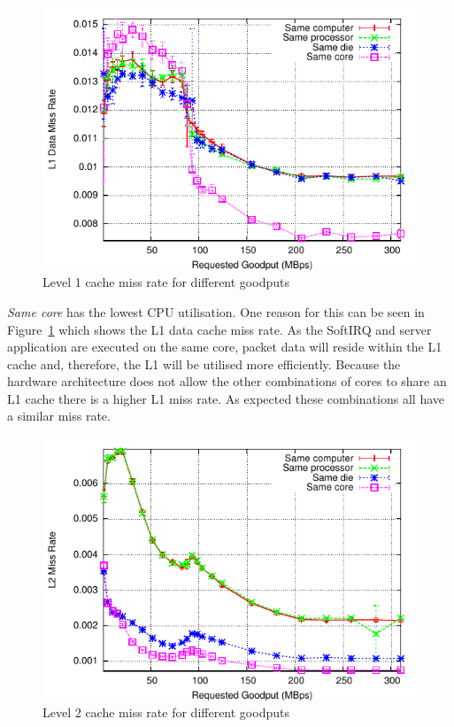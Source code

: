 \documentclass[conference, compsoc]{IEEEtran}
\begin{document}
\begin{figure}[tb]
    \begin{center}
       \includegraphics[height=0.65\columnwidth]{Graphs/intel/two_machines/requested_goodput_vs_L1_MISS_RATE}
    \end{center}
    \caption{Level 1 cache miss rate for different goodputs}
    \label{fig:l1cacherate}
\end{figure}

\emph{Same core} has the lowest CPU utilisation. One reason for this can be seen in Figure~\ref{fig:l1cacherate} which shows the L1 data cache miss rate. As the SoftIRQ and server application are executed on the same core, packet data will reside within the L1 cache and, therefore, the L1 will be utilised more efficiently. Because the hardware architecture does not allow the other combinations of cores to share an L1 cache there is a higher L1 miss rate. As expected these combinations all have a similar miss rate.

\begin{figure}[tb]
    \begin{center}
       \includegraphics[height=0.65\columnwidth]{Graphs/intel/two_machines/requested_goodput_vs_L2_MISS_RATE}
    \end{center}
    \caption{Level 2 cache miss rate for different goodputs}
    \label{fig:l2cacherate}
\end{figure}
\end{document}
